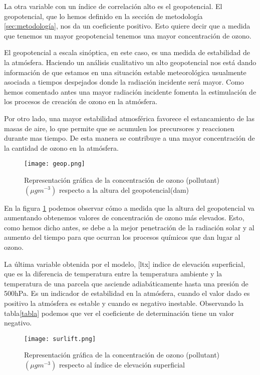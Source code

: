 \documentclass[12pt]{article}
\begin{document}
La otra variable con un índice de correlación alto es el geopotencial. El geopotencial, que lo hemos definido en la sección de metodología \ref{sec:metodología}, nos da un coeficiente positivo. Esto quiere decir que a medida que tenemos un mayor geopotencial tenemos una mayor concentración de ozono.

El geopotencial a escala sinóptica, en este caso, es una medida de estabilidad de la atmósfera. Haciendo un análisis cualitativo un alto geopotencial nos está dando información de  que estamos en una situación estable meteorológica usualmente asociada a tiempos despejados donde la radiación incidente será mayor. Como hemos comentado antes una mayor radiación incidente fomenta la estimulación de los procesos de creación de ozono en la atmósfera.

Por otro lado, una mayor estabilidad atmosférica favorece el estancamiento de las masas de aire, lo que permite que se acumulen los precursores y reaccionen durante mas tiempo. De esta manera se contribuye a una mayor concentración de la cantidad de ozono en la atmósfera.

\begin{figure}[h]
\centering
    \texttt{[image: geop.png]}
    \caption[Concentración de Ozono y la altura del geopotencial]{Representación gráfica de la concentración de ozono (pollutant)  $(\mu g  m^{-3})$ respecto a la altura del geopotencial(dam)} \label{fig:6}
\end{figure}


En la figura \ref{fig:6} podemos observar cómo a medida que la altura del geopotencial va aumentando obtenemos valores de concentración de ozono más elevados. Esto, como hemos dicho antes, se debe a la mejor penetración de la radiación solar y al aumento del tiempo para que ocurran los procesos químicos que dan lugar al ozono.

La última variable obtenida por el modelo, [ltx] indice de elevación superficial, que es la diferencia de temperatura entre la temperatura ambiente y la temperatura de una parcela que asciende adiabáticamente hasta una presión de 500hPa. Es un indicador de estabilidad en la atmósfera, cuando el valor dado es positivo la atmósfera es estable y cuando es negativo inestable. Observando la tabla\ref{tabla} podemos que ver el coeficiente de determinación tiene un valor negativo.
\begin{figure}[h]
\centering
    \texttt{[image: surlift.png]}
    \caption[Concentración de Ozono vs indice de elevación superficial]{Representación gráfica de la concentración de ozono (pollutant)  $(\mu g  m^{-3})$ respecto al índice de elevación superficial} \label{fig:7}
\end{figure}
\end{document}
